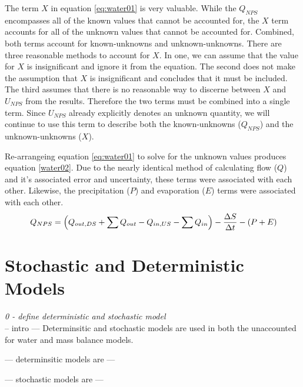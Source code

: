\begin{linenumbers}
The term $ X $ in equation \ref{eq:water01} is very valuable.  While the $ Q_{NPS} $ encompasses all of the known values that cannot be accounted for, the $ X $ term accounts for all of the unknown values that cannot be accounted for.  Combined, both terms account for known-unknowns and unknown-unknowns.  There are three reasonable methods to account for $ X $.  In one, we can assume that the value for $ X $ is insignificant and ignore it from the equation.  The second does not make the assumption that $ X $ is insignificant and concludes that it must be included.  The third assumes that there is no reasonable way to discerne between $ X $ and $ U_{NPS} $ from the results.  Therefore the two terms must be combined into a single term.  Since $ U_{NPS} $ already explicitly denotes an unknown quantity, we will continue to use this term to describe both the known-unknowns ($ Q_{NPS} $) and the unknown-unknowns ($ X $).

Re-arrangeing equation \ref{eq:water01} to solve for the unknown values produces equation \ref{water02}.  Due to the nearly identical method of calculating flow ($ Q $) and it's associated error and uncertainty, these terms were associated with each other.  Likewise, the precipitation ($ P $) and evaporation ($ E $) terms were associated with each other.
\begin{equation}\
Q_{NPS} = \left( Q_{out,DS} + \sum Q_{out} - Q_{in,US} - \sum Q_{in} \right) - \frac{\Delta S}{\Delta t} - \left( P + E \right)\\ \label{water02}
\end{equation}


\clearpage{}
\section{Stochastic and Deterministic Models}
\label{sec:StochAndDetermModels}

\emph{0 - define deterministic and stochastic model}\\

-- intro --- Determinsitic and stochastic models are used in both the unaccounted for water and mass balance models.

--- determinsitic models are ---

--- stochastic models are ---



\end{linenumbers}
